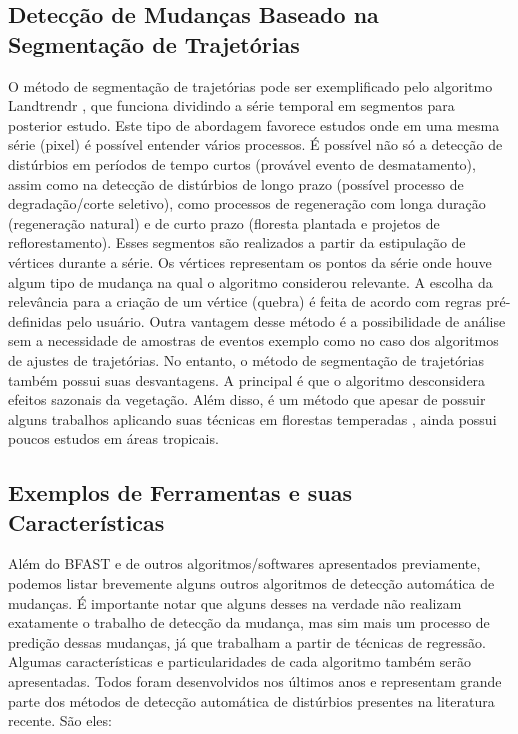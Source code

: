 \documentclass[12pt,a4paper]{article}
\begin{document}
\subsection{Detecção de Mudanças Baseado na Segmentação de Trajetórias}
\hspace{13pt} O método de segmentação de trajetórias pode ser exemplificado pelo algoritmo Landtrendr \citep{KENNEDY20102897, KENNEDY2012117}, que funciona dividindo a série temporal em segmentos para posterior estudo. Este tipo de abordagem favorece estudos onde em uma mesma série (pixel) é possível entender vários processos. É possível não só a detecção de distúrbios em períodos de tempo curtos (provável evento de desmatamento), assim como na detecção de distúrbios de longo prazo (possível processo de degradação/corte seletivo), como processos de regeneração com longa duração (regeneração natural) e de curto prazo (floresta plantada e projetos de reflorestamento). Esses segmentos são realizados a partir da estipulação de vértices durante a série. Os vértices representam os pontos da série onde houve algum tipo de mudança na qual o algoritmo considerou relevante. A escolha da relevância para a criação de um vértice (quebra) é feita de acordo com regras pré-definidas pelo usuário. Outra vantagem desse método é a possibilidade de análise sem a necessidade de amostras de eventos exemplo como no caso dos algoritmos de ajustes de trajetórias.
No entanto, o método de segmentação de trajetórias também possui suas desvantagens. A principal é que o algoritmo desconsidera efeitos sazonais da vegetação. Além disso, é um método que apesar de possuir alguns trabalhos aplicando suas técnicas em florestas temperadas \citep{PFLUGMACHER2012146, Griffiths2015}, ainda possui poucos estudos em áreas tropicais.

\subsection{Exemplos de Ferramentas e suas Características}
\hspace{13pt} Além do BFAST e de outros algoritmos/softwares apresentados previamente, podemos listar brevemente alguns outros algoritmos de detecção automática de mudanças. É importante notar que alguns desses na verdade não realizam exatamente o trabalho de detecção da mudança, mas sim mais um processo de predição dessas mudanças, já que trabalham a partir de técnicas de regressão. Algumas características e particularidades de cada algoritmo também serão apresentadas. Todos foram desenvolvidos nos últimos anos e representam grande parte dos métodos de detecção automática de distúrbios presentes na literatura recente. São eles: 
\end{document}
